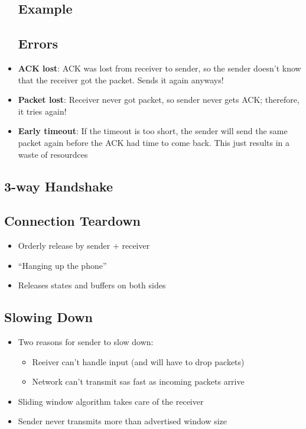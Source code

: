 \begin{itemize}
	\subsection{Example}
	\subsection{Errors}
	\item \textbf{ACK lost}: ACK was lost from receiver to sender, so the sender doesn't know that the receiver got the packet. Sends it again anyways!
	\item \textbf{Packet lost}: Receiver never got packet, so sender never gets ACK; therefore, it tries again!
	\item \textbf{Early timeout}: If the timeout is too short, the sender will send the same packet again before the ACK had time to come back. This just results in a waste of resourdces
\end{itemize}

\subsection{3-way Handshake}

\subsection{Connection Teardown}
\begin{itemize}
	\item Orderly release by sender + receiver
	\item ``Hanging up the phone''
	\item Releases states and buffers on both sides
\end{itemize}

\subsection{Slowing Down}
\begin{itemize}
	\item Two reasons for sender to slow down:
	\begin{itemize}
		\item Reeiver can't handle input (and will have to drop packets)
		\item Network can't transmit sas fast as incoming packets arrive
	\end{itemize}
	\item Sliding window algorithm takes care of the receiver
	\item Sender never transmits more than advertised window size 
\end{itemize}

